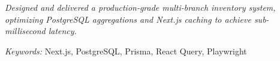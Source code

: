 \noindent
{}

\noindent
\textit{Designed and delivered a production-grade multi-branch inventory system, optimizing PostgreSQL aggregations and Next.js caching to achieve sub-millisecond latency.}

\noindent
\textit{Keywords:} Next.js, PostgreSQL, Prisma, React Query, Playwright
